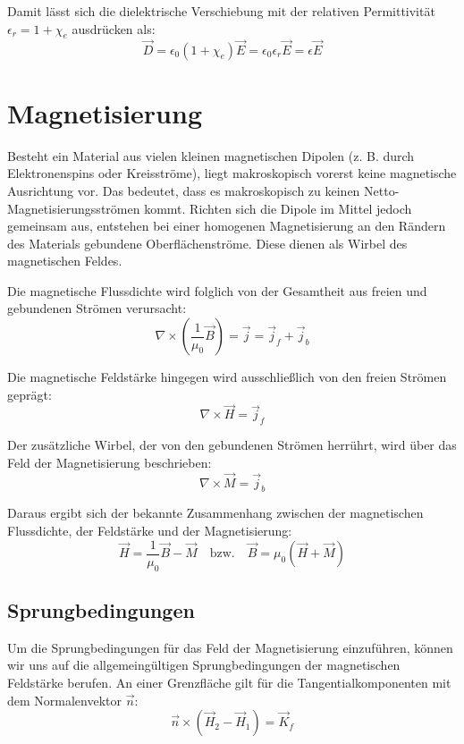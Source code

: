\documentclass[11pt]{article}
\begin{document}
Damit lässt sich die dielektrische Verschiebung mit der relativen Permittivität $\epsilon_r = 1 + \chi_e$ ausdrücken als:
\begin{equation}
    \vec{D} = \epsilon_0 (1 + \chi_e) \vec{E} = \epsilon_0 \epsilon_r \vec{E} = \epsilon \vec{E}
\end{equation}


\section{Magnetisierung}
Besteht ein Material aus vielen kleinen magnetischen Dipolen (z. B. durch Elektronenspins oder Kreisströme), liegt makroskopisch vorerst keine magnetische Ausrichtung vor. Das bedeutet, dass es makroskopisch zu keinen Netto-Magnetisierungsströmen kommt. Richten sich die Dipole im Mittel jedoch gemeinsam aus, entstehen bei einer homogenen Magnetisierung an den Rändern des Materials gebundene Oberflächenströme. Diese dienen als Wirbel des magnetischen Feldes.

Die magnetische Flussdichte wird folglich von der Gesamtheit aus freien und gebundenen Strömen verursacht:
\begin{equation}
    \nabla \times \left(\frac{1}{\mu_0} \vec{B}\right) = \vec{j} = \vec{j}_f + \vec{j}_b
\end{equation}

Die magnetische Feldstärke hingegen wird ausschließlich von den freien Strömen geprägt:
\begin{equation}
    \nabla \times \vec{H} = \vec{j}_f
\end{equation}

Der zusätzliche Wirbel, der von den gebundenen Strömen herrührt, wird über das Feld der Magnetisierung beschrieben:
\begin{equation}
    \nabla \times \vec{M} = \vec{j}_b
\end{equation}

Daraus ergibt sich der bekannte Zusammenhang zwischen der magnetischen Flussdichte, der Feldstärke und der Magnetisierung:
\begin{equation}
    \vec{H} = \frac{1}{\mu_0} \vec{B} - \vec{M} \quad \text{bzw.} \quad \vec{B} = \mu_0 (\vec{H} + \vec{M})
\end{equation}

\subsection{Sprungbedingungen}
Um die Sprungbedingungen für das Feld der Magnetisierung einzuführen, können wir uns auf die allgemeingültigen Sprungbedingungen der magnetischen Feldstärke berufen. An einer Grenzfläche gilt für die Tangentialkomponenten mit dem Normalenvektor $\vec{n}$:
\begin{equation}
    \vec{n} \times (\vec{H}_2 - \vec{H}_1) = \vec{K}_f
\end{equation}
\end{document}
